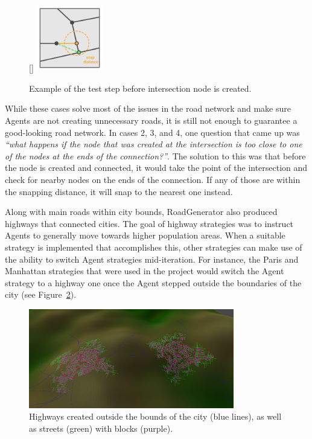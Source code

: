 \begin{figure}
  \centering
  \raisebox{0pt}[\dimexpr{}\baselineskip\relax]{
    \includegraphics[width=0.26\textwidth]{figure/road_intersection_final_test.png}
  }
  \caption{Example of the test step before intersection node is created.}

  \label{fig:road_intersection_final_test}
\end{figure}

While these cases solve most of the issues in the road network and make sure Agents are not creating unnecessary roads, it is still not enough to guarantee a good-looking road network.
In cases 2, 3, and 4, one question that came up was \textit{``what happens if the node that was created at the intersection is too close to one of the nodes at the ends of the connection?''}.
The solution to this was that before the node is created and connected, it would take the point of the intersection and check for nearby nodes on the ends of the connection.
If any of those are within the snapping distance, it will snap to the nearest one instead.


Along with main roads within city bounds, RoadGenerator also produced highways that connected cities.
The goal of highway strategies was to instruct Agents to generally move towards higher population areas.
When a suitable strategy is implemented that accomplishes this, other strategies can make use of the ability to switch Agent strategies mid-iteration.
For instance, the Paris and Manhattan strategies that were used in the project would switch the Agent strategy to a highway one once the Agent stepped outside the boundaries of the city (see Figure~\ref{fig:road_highways}).

\begin{figure}[H]
  \centering

  \includegraphics[width=0.8\textwidth]{figure/road_highways.png}
  \caption{Highways created outside the bounds of the city (blue lines), as well as streets (green) with blocks (purple).}

  \label{fig:road_highways}
\end{figure}

